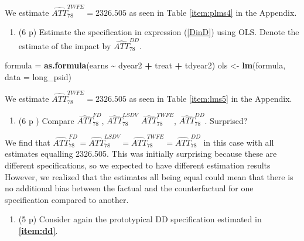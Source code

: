 \documentclass[
]{article}
\newenvironment{Shaded}{\begin{snugshade}}{\end{snugshade}}
\newcommand{\AttributeTok}[1]{\textcolor[rgb]{0.13,0.29,0.53}{#1}}
\newcommand{\FunctionTok}[1]{\textcolor[rgb]{0.13,0.29,0.53}{\textbf{#1}}}
\newcommand{\NormalTok}[1]{#1}
\newcommand{\OtherTok}[1]{\textcolor[rgb]{0.56,0.35,0.01}{#1}}
\newcommand{\SpecialCharTok}[1]{\textcolor[rgb]{0.81,0.36,0.00}{\textbf{#1}}}
\providecommand{\tightlist}{%
  \setlength{\itemsep}{0pt}\setlength{\parskip}{0pt}}
\begin{document}
We estimate \(\widehat{ATT}_{78}^{TWFE} = 2326.505\) as seen in Table
\ref{item:plms4} in the Appendix.

\begin{enumerate}
\def\labelenumi{\arabic{enumi}.}
\setcounter{enumi}{4}
\tightlist
\item
  (6 p) Estimate the specification in expression (\ref{DinD}) using OLS.
  Denote the estimate of the impact by
  \(\widehat{ATT}_{78}^{DD}\).\label{item:dd}
\end{enumerate}

\begin{Shaded}
\begin{Highlighting}[]
\NormalTok{formula }\OtherTok{=} \FunctionTok{as.formula}\NormalTok{(earns }\SpecialCharTok{\textasciitilde{}}\NormalTok{ dyear2 }\SpecialCharTok{+}\NormalTok{ treat }\SpecialCharTok{+}\NormalTok{ tdyear2)}
\NormalTok{ols }\OtherTok{\textless{}{-}} \FunctionTok{lm}\NormalTok{(formula, }\AttributeTok{data =}\NormalTok{ long\_psid)}
\end{Highlighting}
\end{Shaded}

We estimate \(\widehat{ATT}_{78}^{TWFE} = 2326.505\) as seen in Table
\ref{item:lms5} in the Appendix.

\begin{enumerate}
\def\labelenumi{\arabic{enumi}.}
\setcounter{enumi}{5}
\tightlist
\item
  (6 p ) Compare \(\widehat{ATT}_{78}^{FD}\),
  \(\widehat{ATT}_{78}^{LSDV}\) \(\widehat{ATT}_{78}^{TWFE}\),
  \(\widehat{ATT}_{78}^{DD}\). Surprised?
\end{enumerate}

We find that
\(\widehat{ATT}_{78}^{FD} = \widehat{ATT}_{78}^{LSDV} = \widehat{ATT}_{78}^{TWFE} = \widehat{ATT}_{78}^{DD}\)
in this case with all estimates equalling 2326.505. This was initially
surprising because these are different specifications, so we expected to
have different estimation results However, we realized that the
estimates all being equal could mean that there is no additional bias
between the factual and the counterfactual for one specification
compared to another.

\begin{enumerate}
\def\labelenumi{\arabic{enumi}.}
\setcounter{enumi}{6}
\tightlist
\item
  (5 p) Consider again the prototypical DD specification estimated in
  \textbf{\ref{item:dd}}.
\end{enumerate}
\end{document}
